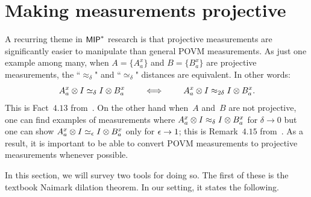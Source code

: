 
\section{Making measurements projective}
\label{sec:making-measurements-projective}

A recurring theme in $\mathsf{MIP}^*$ research is that 
projective measurements are significantly easier to manipulate
than general POVM measurements.
As just one example among many,
when $A = \{A^x_a\}$ and $B = \{B^x_a\}$ are projective measurements,
the ``$\approx_\delta$" and ``$\simeq_\delta$" distances are equivalent.
In other words:
\begin{equation*}
A^x_a \otimes I \simeq_{\delta} I \otimes B^x_a
\qquad
\iff
\qquad
A^x_a \otimes I \approx_{2\delta} I \otimes B^x_a.
\end{equation*}
This is Fact~$4.13$ from~\cite{NW19}.
On the other hand when~$A$ and~$B$
are not projective,
one can find examples of measurements
where $A^x_a \otimes I \approx_{\delta} I \otimes B^x_a$
for $\delta \rightarrow 0$
but one can show $A^x_a \otimes I \simeq_{\epsilon} I \otimes B^x_a$
only for $\epsilon \rightarrow 1$;
this is Remark~$4.15$ from~\cite{NW19}.
As a result, it is important to be able to convert
POVM measurements to projective measurements
whenever possible.

In this section, we will survey two tools for doing so.
The first of these is the textbook Naimark dilation theorem.
In our setting, it states the following.

